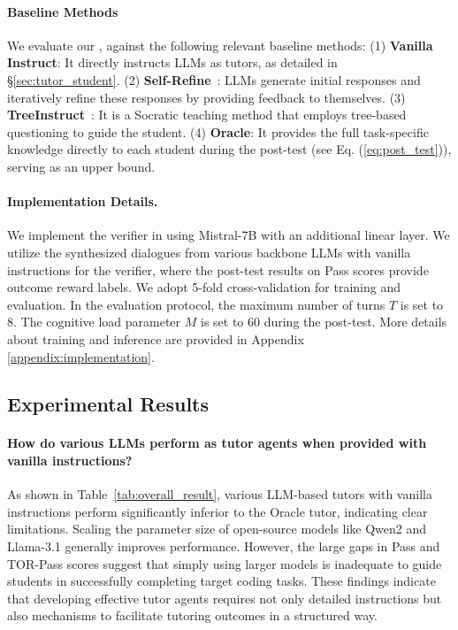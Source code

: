 \paragraph{Baseline Methods}
We evaluate our \model, against the following relevant baseline methods: (1) \textbf{Vanilla Instruct}: It directly instructs LLMs as tutors, as detailed in \S\ref{sec:tutor_student}. (2) \textbf{Self-Refine}~\cite{madaan2023self}: LLMs generate initial responses and iteratively refine these responses by providing feedback to themselves. (3) \textbf{TreeInstruct}~\cite{kargupta-etal-2024-instruct}: It is a Socratic teaching method that %
employs tree-based questioning to guide the student. (4) \textbf{Oracle}: It provides the full task-specific knowledge directly to each student during the post-test (see Eq. (\ref{eq:post_test})), serving as an upper bound.


\paragraph{Implementation Details.}
We implement the verifier in \model using Mistral-7B \cite{jiang2023mistral} with an additional linear layer. We utilize the synthesized dialogues from various backbone LLMs with vanilla instructions for the verifier, where the post-test results on Pass scores provide outcome reward labels. We adopt 5-fold cross-validation for training and evaluation. 
In the \eval evaluation protocol, the maximum number of turns $T$ is set to 8. The cognitive load parameter $M$ is set to 60 during the post-test.
More details about training and inference are provided in Appendix \ref{appendix:implementation}.



\subsection{Experimental Results}

\paragraph{How do various LLMs perform as tutor agents when provided with vanilla instructions?}
As shown in Table~\ref{tab:overall_result}, various LLM-based tutors with vanilla instructions perform significantly inferior to the Oracle tutor, indicating clear limitations. Scaling the parameter size of open-source models like Qwen2 and Llama-3.1 generally improves performance. However, the large gaps in Pass and TOR-Pass scores suggest that simply using larger models is inadequate to guide students in successfully completing target coding tasks. 
These findings indicate that developing effective tutor agents requires not only detailed instructions but also mechanisms to facilitate tutoring outcomes in a structured way.

